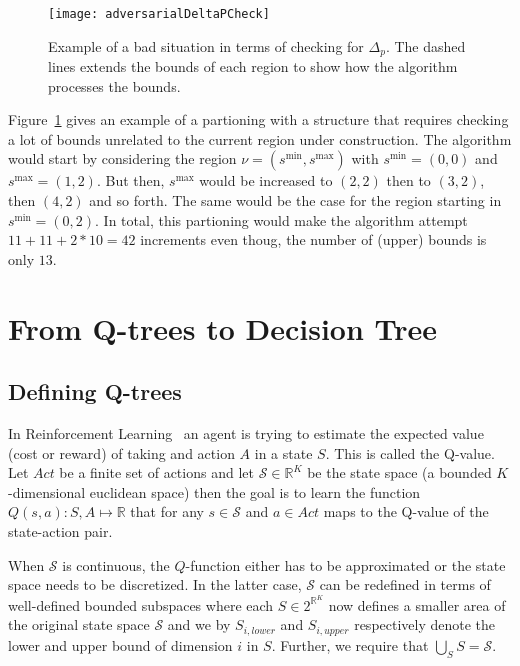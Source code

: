 \begin{figure}[htpb]
    \centering
    \texttt{[image: adversarialDeltaPCheck]}
    \caption{%
        Example of a bad situation in terms of checking for $\Delta_{p}$. The
        dashed lines extends the bounds of each region to show how the algorithm
        processes the bounds.
    }\label{fig:adversarialDeltaPCheck}
\end{figure}

Figure~\ref{fig:adversarialDeltaPCheck} gives an example of a partioning with a
structure that requires checking a lot of bounds unrelated to the current region
under construction. The algorithm would start by considering the region $\nu =
(s^{\min}, s^{\max})$ with $s^{\min} = (0,0)$ and $s^{\max} = (1,2)$. But then,
$s^{\max}$ would be increased to $(2,2)$ then to $(3,2)$, then $(4,2)$ and so
forth. The same would be the case for the region starting in $s^{\min} = (0,2)$.
In total, this partioning would make the algorithm attempt $11 + 11 + 2*10 = 42$
increments even thoug, the number of (upper) bounds is only $13$.


\section{From Q-trees to Decision Tree}%
\label{sec:convergeToDT}

\subsection{Defining Q-trees}%
\label{subsec:defQTrees}

In Reinforcement Learning~\cite{Sutton1998} an agent is trying to estimate the
expected value (cost or reward) of taking and action $A$ in a state $S$. This is
called the Q-value. Let $Act$ be a finite set of actions and let $\mathcal{S}
\in \mathbb{R}^K$ be the state space (a bounded $K$-dimensional euclidean space)
then the goal is to learn the function $Q(s,a) : S, A \mapsto \mathbb{R}$ that
for any $s \in \mathcal{S}$ and $a \in Act$ maps to the Q-value of the
state-action pair.

When $\mathcal{S}$ is continuous, the $Q$-function either has to be approximated
or the state space needs to be discretized. In the latter case, $\mathcal{S}$
can be redefined in terms of well-defined bounded subspaces where each $S \in
2^{\mathbb{R}^{K}}$ now defines a smaller area of the original state space
$\mathcal{S}$ and we by $S_{i,lower}$ and $S_{i,upper}$ respectively denote the lower and
upper bound of dimension $i$ in $S$. Further, we require that $\bigcup_S S =
\mathcal{S}$.

